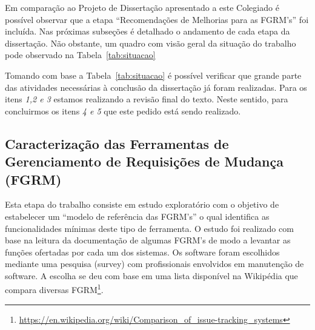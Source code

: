 \documentclass[10pt,a4paper]{report}
\begin{document}
	Em comparação ao Projeto de Dissertação apresentado a este Colegiado é possível
	observar que a etapa ``Recomendações de Melhorias para as FGRM's'' foi incluída.
	Nas próximas subseções é detalhado o andamento de cada etapa da dissertação. Não
	obstante, um quadro com visão geral da situação do trabalho pode observado na
	Tabela~\ref{tab:situacao}

	\begin{table}[ht]
		\centering
		\caption{Situação Geral da Dissertação}
		\label{tab:situacao}
	\end{table}

	Tomando com base a Tabela~\ref{tab:situacao} é possível verificar que grande
	parte das atividades necessárias à conclusão da dissertação já foram realizadas.
	Para os itens \textit{1,2 e 3} estamos realizando a revisão final do texto.
	Neste sentido, para concluirmos os itens \textit{4 e 5} que este pedido está
	sendo realizado.

	\subsection{Caracterização das Ferramentas de Gerenciamento de Requisições de
		Mudança (FGRM)}
	\label{subsec:caracterizacao}

	Esta etapa do trabalho consiste em estudo exploratório com o objetivo de
	estabelecer um ``modelo de referência das FGRM's'' o qual identifica as
	fun\-ci\-o\-na\-li\-da\-des mínimas deste tipo de ferramenta. O estudo foi
	realizado com base na leitura da documentação de algumas FGRM's de modo a
	levantar as funções ofertadas por cada um dos sistemas. Os software foram
	escolhidos mediante uma pesquisa (survey) com profissionais envolvidos em
	manutenção de software. A escolha se deu com base em uma lista disponível na
	Wikipédia que compara diversas
	FGRM\footnote{\url{https://en.wikipedia.org/wiki/Comparison_of_issue-tracking_systems}}.
\end{document}

